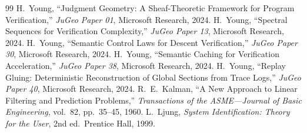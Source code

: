 \documentclass[11pt]{article}
\begin{document}
\begin{thebibliography}{99}
 H.\ Young, ``Judgment Geometry: A Sheaf-Theoretic
  Framework for Program Verification,'' \textit{JuGeo Paper 01},
  Microsoft Research, 2024.
 H.\ Young, ``Spectral Sequences for Verification
  Complexity,'' \textit{JuGeo Paper 13}, Microsoft Research, 2024.
 H.\ Young, ``Semantic Control Laws for Descent
  Verification,'' \textit{JuGeo Paper 30}, Microsoft Research, 2024.
 H.\ Young, ``Semantic Caching for Verification
  Acceleration,'' \textit{JuGeo Paper 38}, Microsoft Research, 2024.
 H.\ Young, ``Replay Gluing: Deterministic
  Reconstruction of Global Sections from Trace Logs,''
  \textit{JuGeo Paper 40}, Microsoft Research, 2024.
 R.\ E.\ Kalman, ``A New Approach to Linear Filtering
  and Prediction Problems,'' \textit{Transactions of the ASME---Journal
  of Basic Engineering}, vol.\ 82, pp.\ 35--45, 1960.
 L.\ Ljung, \textit{System Identification: Theory for
  the User}, 2nd ed.\ Prentice Hall, 1999.
\end{thebibliography}
\end{document}
